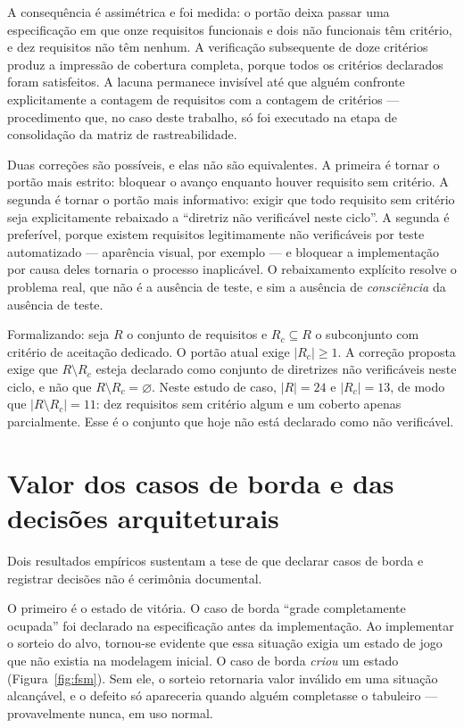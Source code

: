 A consequência é assimétrica e foi medida: o portão deixa passar uma
especificação em que onze requisitos funcionais e dois não funcionais têm
critério, e dez requisitos não têm nenhum. A verificação subsequente de doze
critérios produz a impressão de cobertura completa, porque todos os critérios
declarados foram satisfeitos. A lacuna permanece invisível até que alguém
confronte explicitamente a contagem de requisitos com a contagem de critérios ---
procedimento que, no caso deste trabalho, só foi executado na etapa de
consolidação da matriz de rastreabilidade.

Duas correções são possíveis, e elas não são equivalentes. A primeira é tornar o
portão mais estrito: bloquear o avanço enquanto houver requisito sem critério. A
segunda é tornar o portão mais informativo: exigir que todo requisito sem
critério seja explicitamente rebaixado a ``diretriz não verificável neste
ciclo''. A segunda é preferível, porque existem requisitos legitimamente não
verificáveis por teste automatizado --- aparência visual, por exemplo --- e
bloquear a implementação por causa deles tornaria o processo inaplicável. O
rebaixamento explícito resolve o problema real, que não é a ausência de teste, e
sim a ausência de \emph{consciência} da ausência de teste.

Formalizando: seja $R$ o conjunto de requisitos e $R_c \subseteq R$ o subconjunto
com critério de aceitação dedicado. O portão atual exige $|R_c| \geq 1$. A
correção proposta exige que $R \setminus R_c$ esteja declarado como conjunto de
diretrizes não verificáveis neste ciclo, e não que $R \setminus R_c = \varnothing$.
Neste estudo de caso, $|R| = 24$ e $|R_c| = 13$, de modo que
$|R \setminus R_c| = 11$: dez requisitos sem critério algum e um coberto apenas
parcialmente. Esse é o conjunto que hoje não está declarado como não verificável.

\section{Valor dos casos de borda e das decisões arquiteturais}
\label{sec:disc-bordas}

Dois resultados empíricos sustentam a tese de que declarar casos de borda e
registrar decisões não é cerimônia documental.

O primeiro é o estado de vitória. O caso de borda ``grade completamente
ocupada'' foi declarado na especificação antes da implementação. Ao implementar
o sorteio do alvo, tornou-se evidente que essa situação exigia um estado de jogo
que não existia na modelagem inicial. O caso de borda \emph{criou} um estado
(Figura~\ref{fig:fsm}). Sem ele, o sorteio retornaria valor inválido em uma
situação alcançável, e o defeito só apareceria quando alguém completasse o
tabuleiro --- provavelmente nunca, em uso normal.

